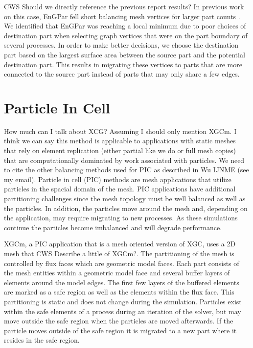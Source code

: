 \documentclass[conference]{IEEEtran}
\begin{document}
{\color{red} CWS Should we directly reference the previous report results?}
In previous work on this case, EnGPar fell short balancing mesh vertices for larger part counts
\cite{engparSC17}.
We identified that EnGPar was reaching a local minimum due to poor choices of destination part
when selecting graph vertices that were on the part boundary of several processes. In order
to make better decisions, we choose the destination part based on the largest surface area
between the source part and the potential destination part. This results in migrating these
vertices to parts that are more connected to the source part instead of parts that may only
share a few edges.

\section{Particle In Cell}


{\color{red} How much can I talk about XCG? Assuming I should only mention XGCm.
I think we can say this method is applicable to applications with static meshes
that rely on element replication (either partial like we do or full mesh copies)
that are computationally dominated by work associated with particles.  We need
to cite the other balancing methods used for PIC as described in Wu IJNME (see
my email).}
Particle in cell (PIC) methods are mesh applications that utilize particles in the spacial domain
of the mesh. PIC applications have additional partitioning challenges since the mesh topology
must be well balanced as well as the particles. In addition, the particles move around the mesh
and, depending on the application, may require migrating to new processes. As these simulations
continue the particles become imbalanced and will degrade performance.

XGCm, a PIC application that is a mesh oriented version of XGC, uses a 2D mesh that
{\color{red} CWS Describe a little of XGCm?}. The partitioning of the mesh is controlled
by flux faces which are geometric model faces. Each part consists of
the mesh entities within a geometric model face and several buffer layers of elements around the
model edges. The first few layers of the buffered elements are marked as a safe region as well as
the elements within the flux face. This partitioning is static and does not change during the
simulation. Particles exist within the safe elements of a process during an iteration of the
solver, but may move outside the safe region when the particles are moved afterwards. If the
particle moves outside of the safe region it is migrated to a new part where it resides in
the safe region.
\end{document}
